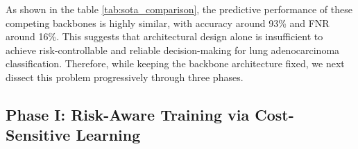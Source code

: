 \documentclass[journal,twoside,web]{ieeecolor}
\begin{document}
\begin{table}[htbp]
    \centering
    \caption{Performance comparison of baseline and other competing models.}\label{tab:sota_comparison}
\end{table}

As shown in the table \ref{tab:sota_comparison}, the predictive performance of these competing backbones is highly similar, with accuracy around 93\% and FNR around 16\%. This suggests that architectural design alone is insufficient to achieve risk-controllable and reliable decision-making for lung adenocarcinoma classification. Therefore, while keeping the backbone architecture fixed, we next dissect this problem progressively through three phases.



\subsection{Phase I: Risk-Aware Training via Cost-Sensitive Learning}\label{sec:phase1_results}
\end{document}
